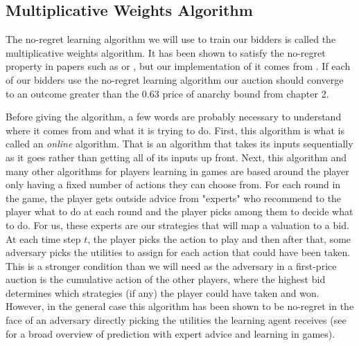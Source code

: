\documentclass[12pt,twoside]{reedthesis}
\begin{document}
\subsection{Multiplicative Weights Algorithm}
The no-regret learning algorithm we will use to train our bidders is called the multiplicative weights algorithm. It has been shown to satisfy the no-regret property in papers such as \citet{Littlestone1994} or \citet{Freund1999}, but our implementation of it comes from \cite{Roughgarden2016}. If each of our bidders use the no-regret learning algorithm our auction should converge to an outcome greater than the $0.63$ price of anarchy bound from chapter 2. 

Before giving the algorithm, a few words are probably necessary to understand where it comes from and what it is trying to do. First, this algorithm is what is called an {\em online} algorithm. That is an algorithm that takes its inputs sequentially as it goes rather than getting all of its inputs up front. Next, this algorithm and many other algorithms for players learning in games are based around the player only having a fixed number of actions they can choose from. For each round in the game, the player gets outside advice from "experts" who recommend to the player what to do at each round and the player picks among them to decide what to do. For us, these experts are our strategies that will map a valuation to a bid. At each time step $t$, the player picks the action to play and then after that, some adversary picks the utilities to assign for each action that could have been taken. This is a stronger condition than we will need as the adversary in a first-price auction is the cumulative action of the other players, where the highest bid determines which strategies (if any) the player could have taken and won. However, in the general case this algorithm has been shown to be no-regret in the face of an adversary directly picking the utilities the learning agent receives (see \cite{Lugosi2006} for a broad overview of prediction with expert advice and learning in games).\\
\end{document}
